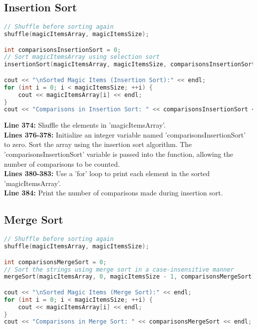 \documentclass[letterpaper, 10pt,DIV=13]{scrartcl}
\numberwithin{equation}{section} %
\numberwithin{figure}{section} %
\numberwithin{table}{section} %
\begin{document}
\subsection{Insertion Sort}
\begin{linenumbers}
\begin{lstlisting}[language=C++, caption={Insertion Sort}, label={code:example}]
// Shuffle before sorting again
shuffle(magicItemsArray, magicItemsSize);

int comparisonsInsertionSort = 0;
// Sort magicItemsArray using selection sort
insertionSort(magicItemsArray, magicItemsSize, comparisonsInsertionSort);

cout << "\nSorted Magic Items (Insertion Sort):" << endl;
for (int i = 0; i < magicItemsSize; ++i) {
    cout << magicItemsArray[i] << endl;
}
cout << "Comparisons in Insertion Sort: " << comparisonsInsertionSort << endl;
\end{lstlisting}
\end{linenumbers}
\nolinenumbers

\textbf{Line 374:} Shuffle the elements in 'magicItemsArray'. \\
\textbf{Lines 376-378:} Initialize an integer variable named 'comparisonsInsertionSort' to zero. Sort the array using the insertion sort algorithm. The 'comparisonsInsertionSort' variable is passed into the function, allowing the number of comparisons to be counted. \\
\textbf{Lines 380-383:} Use a 'for' loop to print each element in the sorted 'magicItemsArray'. \\
\textbf{Line 384:} Print the number of comparisons made during insertion sort.

\subsection{Merge Sort}
\begin{linenumbers}
\begin{lstlisting}[language=C++, caption={Merge Sort}, label={code:example}]
// Shuffle before sorting again
shuffle(magicItemsArray, magicItemsSize);

int comparisonsMergeSort = 0;
// Sort the strings using merge sort in a case-insensitive manner
mergeSort(magicItemsArray, 0, magicItemsSize - 1, comparisonsMergeSort);

cout << "\nSorted Magic Items (Merge Sort):" << endl;
for (int i = 0; i < magicItemsSize; ++i) {
    cout << magicItemsArray[i] << endl;
}
cout << "Comparisons in Merge Sort: " << comparisonsMergeSort << endl;
\end{lstlisting}
\end{linenumbers}
\nolinenumbers
\end{document}

